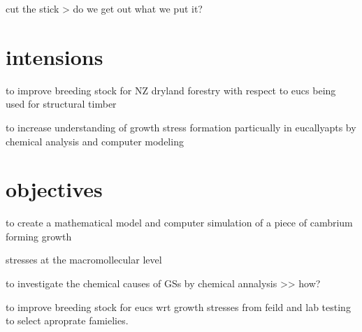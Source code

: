 \documentclass{article}
\begin{document}
cut the stick > do we get out what we put it?

\section{intensions}
to improve breeding stock for NZ dryland forestry with respect to eucs being used for structural timber

to increase understanding of growth stress formation particually in eucallyapts by chemical analysis and computer modeling

\section{objectives}

to create a mathematical model and computer simulation of a piece of cambrium forming growth

stresses at the macromollecular level

to investigate the chemical causes of GSs by chemical annalysis >> how?

to improve breeding stock for eucs wrt growth stresses from feild and lab testing to select aproprate famielies.
\end{document}
